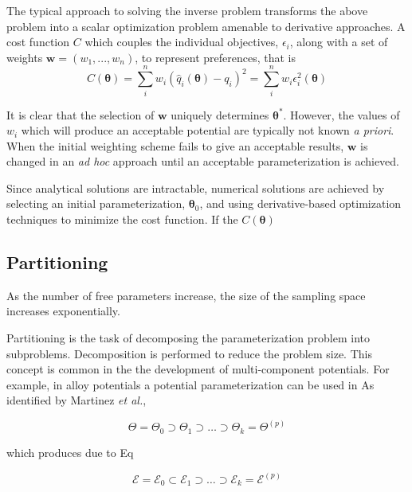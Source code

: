 The typical approach to solving the inverse problem transforms the above problem into a scalar optimization problem amenable to derivative approaches.  A cost function $C$ which couples the individual objectives, $\epsilon_i$, along with a set of weights $\bm{w} = (w_1,...,w_n)$, to represent preferences, that is
\begin{equation}
    C(\bm{\theta}) = \sum_i^n w_i (\hat{q}_i(\bm{\theta}) - q_i)^2
                   = \sum_i^n w_i \epsilon_i^2(\bm{\theta})
\end{equation}

It is clear that the selection of $\bm{w}$ uniquely determines $\bm{\theta}^*$.  However, the values of $w_i$ which will produce an acceptable potential are typically not known \emph{a priori}.  When the initial weighting scheme fails to give an acceptable results, $\bm{w}$ is changed in an \emph{ad hoc} approach until an acceptable parameterization is achieved.

Since analytical solutions are intractable, numerical solutions are achieved by selecting an initial parameterization, $\bm{\theta}_0$, and using derivative-based optimization techniques to minimize the cost function.  If the $C(\bm{\theta})$

\subsection{Partitioning}

As the number of free parameters increase, the size of the sampling space increases exponentially.

Partitioning is the task of decomposing the parameterization problem into subproblems.  Decomposition is performed to reduce the problem size.  This concept is common in the the development of multi-component potentials.   For example, in alloy potentials a potential parameterization can be used in  As identified by Martinez \emph{et al.},

\begin{equation}
    \Theta = \Theta_0 \supset \Theta_1 \supset \hdots \supset \Theta_k = \Theta^{(p)}
\end{equation}

which produces due to Eq %

\begin{equation}
    \mathcal{E} = \mathcal{E}_0 \subset \mathcal{E}_1 \supset \hdots \supset \mathcal{E}_k = \mathcal{E}^{(p)}
\end{equation}

